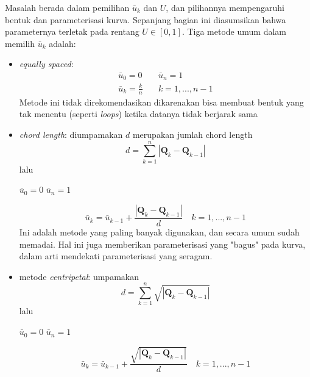 Masalah berada dalam pemilihan $\bar{u}_k$ dan $U$, 
dan pilihannya mempengaruhi bentuk dan parameterisasi 
kurva. Sepanjang bagian ini diasumsikan bahwa 
parameternya terletak pada rentang $U \in [0, 1]$. 
Tiga metode umum dalam memilih $\bar{u}_k$ adalah:
\begin{itemize}
	\item \textit{equally spaced}: \\
	\begin{equation}
		\begin{split}
			\bar{u}_0 = 0 \quad & \bar{u}_n = 1 \\
			\bar{u}_k = \frac{k}{n} \quad & k = 1, ..., n-1
		\end{split}
		\label{rumus:equallyspaced}
	\end{equation}
	Metode ini tidak direkomendasikan dikarenakan 
	bisa membuat bentuk yang tak menentu (seperti \textit{loops}) 
	ketika datanya tidak berjarak sama

	\item \textit{chord length}: diumpamakan $d$ 
	merupakan jumlah chord length
	\begin{equation}
		d = \sum_{k=1}^{n}|\textbf{Q}_k - \textbf{Q}_{k-1}|
		\label{chordlength1}
	\end{equation}
	lalu \centerline {\quad $\bar{u}_0 = 0$ \quad $\bar{u}_n = 1$}
	\begin{equation}
		\bar{u}_k = \bar{u}_{k-1} + \frac{|\textbf{Q}_k - \textbf{Q}_{k-1}|}{d} \quad
		k = 1, ..., n-1
		\label{chordlength2}
	\end{equation}
	Ini adalah metode yang paling banyak digunakan, 
	dan secara umum sudah memadai. Hal ini juga 
	memberikan parameterisasi yang "bagus" pada 
	kurva, dalam arti mendekati parameterisasi 
	yang seragam.

	\item metode \textit{centripetal}: umpamakan
	\[d = \sum_{k=1}^{n} \sqrt{|\textbf{Q}_k - \textbf{Q}_{k-1}|} \]
	lalu \centerline {\quad $\bar{u}_0 = 0$ \quad $\bar{u}_n = 1$}
	\begin{equation}
		\bar{u}_k = \bar{u}_{k-1} + \frac{\sqrt{|\textbf{Q}_k - \textbf{Q}_{k-1}|}}{d} \quad
		k = 1, ..., n-1
		\label{centripetal}
	\end{equation}
\end{itemize}

